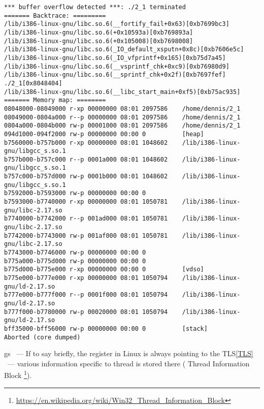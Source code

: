 \begin{lstlisting}
*** buffer overflow detected ***: ./2_1 terminated
======= Backtrace: =========
/lib/i386-linux-gnu/libc.so.6(__fortify_fail+0x63)[0xb7699bc3]
/lib/i386-linux-gnu/libc.so.6(+0x10593a)[0xb769893a]
/lib/i386-linux-gnu/libc.so.6(+0x105008)[0xb7698008]
/lib/i386-linux-gnu/libc.so.6(_IO_default_xsputn+0x8c)[0xb7606e5c]
/lib/i386-linux-gnu/libc.so.6(_IO_vfprintf+0x165)[0xb75d7a45]
/lib/i386-linux-gnu/libc.so.6(__vsprintf_chk+0xc9)[0xb76980d9]
/lib/i386-linux-gnu/libc.so.6(__sprintf_chk+0x2f)[0xb7697fef]
./2_1[0x8048404]
/lib/i386-linux-gnu/libc.so.6(__libc_start_main+0xf5)[0xb75ac935]
======= Memory map: ========
08048000-08049000 r-xp 00000000 08:01 2097586    /home/dennis/2_1
08049000-0804a000 r--p 00000000 08:01 2097586    /home/dennis/2_1
0804a000-0804b000 rw-p 00001000 08:01 2097586    /home/dennis/2_1
094d1000-094f2000 rw-p 00000000 00:00 0          [heap]
b7560000-b757b000 r-xp 00000000 08:01 1048602    /lib/i386-linux-gnu/libgcc_s.so.1
b757b000-b757c000 r--p 0001a000 08:01 1048602    /lib/i386-linux-gnu/libgcc_s.so.1
b757c000-b757d000 rw-p 0001b000 08:01 1048602    /lib/i386-linux-gnu/libgcc_s.so.1
b7592000-b7593000 rw-p 00000000 00:00 0
b7593000-b7740000 r-xp 00000000 08:01 1050781    /lib/i386-linux-gnu/libc-2.17.so
b7740000-b7742000 r--p 001ad000 08:01 1050781    /lib/i386-linux-gnu/libc-2.17.so
b7742000-b7743000 rw-p 001af000 08:01 1050781    /lib/i386-linux-gnu/libc-2.17.so
b7743000-b7746000 rw-p 00000000 00:00 0
b775a000-b775d000 rw-p 00000000 00:00 0
b775d000-b775e000 r-xp 00000000 00:00 0          [vdso]
b775e000-b777e000 r-xp 00000000 08:01 1050794    /lib/i386-linux-gnu/ld-2.17.so
b777e000-b777f000 r--p 0001f000 08:01 1050794    /lib/i386-linux-gnu/ld-2.17.so
b777f000-b7780000 rw-p 00020000 08:01 1050794    /lib/i386-linux-gnu/ld-2.17.so
bff35000-bff56000 rw-p 00000000 00:00 0          [stack]
Aborted (core dumped)
\end{lstlisting}

gs ~--- 
{If to say briefly, the  register in Linux is always pointing to the \ac{TLS}\ref{TLS} ~--- various information specific
to thread is stored there}
(
Thread Information Block
\footnote{\url{https://en.wikipedia.org/wiki/Win32_Thread_Information_Block}}). 

